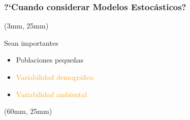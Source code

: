 \begin{frame}
    \frametitle{?`Cuando considerar Modelos Estoc\'asticos?}
    \begin{textblock*}{45mm}(3mm, 25mm)
        \begin{greenbox}{Sean importantes}
            \begin{itemize}
                \item
                    Poblaciones peque\~nas
                \item
                    \textcolor<2>{orange}{
                        Variabilidad demogr\'afica
                    }
                \item
                    \textcolor<3>{orange}{
                        Variabilidad ambiental
                    }
            \end{itemize}
        \end{greenbox}
    \end{textblock*}
    \begin{textblock*}{60mm}(60mm, 25mm)
        \begin{bluebox}{
        }
        \end{bluebox}
    \end{textblock*}
\end{frame}
